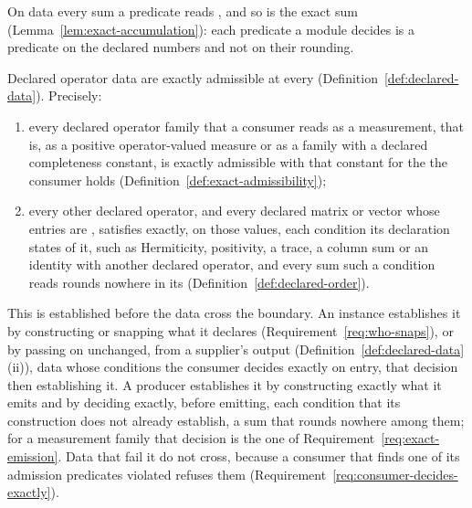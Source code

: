 
On  data every sum a predicate reads
, and so is the exact sum
(Lemma~\ref{lem:exact-accumulation}): each predicate a module decides is a
predicate on the declared numbers and not on their rounding.

\begin{requirement}\label{req:boundary-admission}
Declared operator data are exactly admissible at every
 (Definition~\ref{def:declared-data}). Precisely:
\begin{enumerate}[label=(\roman*),leftmargin=2.4em]
\item every declared operator family that a consumer reads as a measurement,
  that is, as a positive operator-valued measure or as a family with a
  declared completeness constant, is exactly admissible with that constant for
  the  the consumer holds
  (Definition~\ref{def:exact-admissibility});
\item every other declared operator, and every declared matrix or vector
  whose entries are , satisfies exactly,
  on those values, each condition its declaration states of it, such as
  Hermiticity, positivity, a trace, a column sum or an identity with another
  declared operator, and every sum such a condition reads rounds nowhere in
  its  (Definition~\ref{def:declared-order}).
\end{enumerate}
This is established before the data cross the boundary. An instance
establishes it by constructing or snapping what it declares
(Requirement~\ref{req:who-snaps}), or by passing on unchanged, from a
supplier's output (Definition~\ref{def:declared-data}\,(ii)), data whose
conditions the consumer decides exactly on entry, that decision then
establishing it. A producer establishes it by constructing exactly what it
emits and by deciding exactly, before emitting, each condition that its
construction does not already establish, a sum that rounds nowhere among them;
for a measurement family that decision is the one of
Requirement~\ref{req:exact-emission}. Data that fail it do not cross, because
a consumer that finds one of its admission predicates violated refuses them
(Requirement~\ref{req:consumer-decides-exactly}).
\end{requirement}
